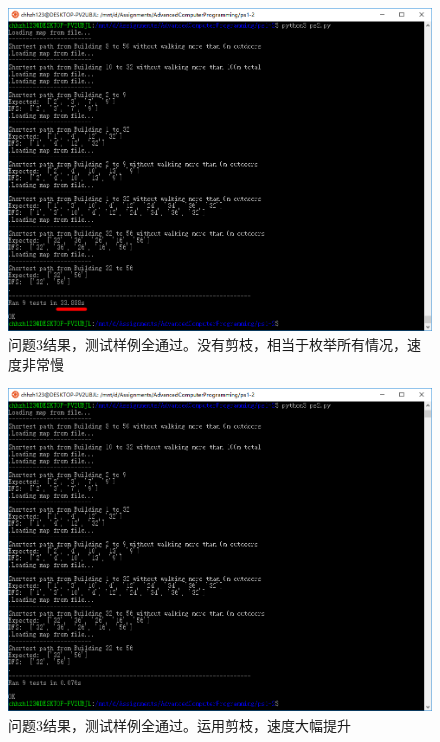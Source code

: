 \documentclass[logo,reportComp]{thesis}
\begin{document}
\begin{figure}[H]
\centering
\includegraphics[width=\linewidth]{fig/no_cut.PNG}
\caption{问题3结果，测试样例全通过。没有剪枝，相当于枚举所有情况，速度非常慢}
\label{fig:no_cut}
\end{figure}

\begin{figure}[H]
\centering
\includegraphics[width=\linewidth]{fig/cut.PNG}
\caption{问题3结果，测试样例全通过。运用剪枝，速度大幅提升}
\label{fig:cut}
\end{figure}
\end{document}
